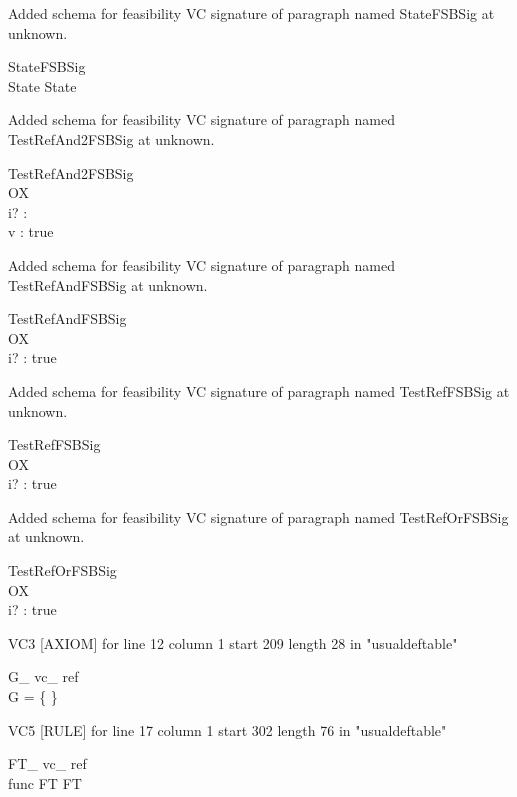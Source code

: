 \documentclass{article}
\begin{document}
Added schema for feasibility VC signature of paragraph named StateFSBSig at unknown.
\begin{schema}{StateFSBSig}
\\
 State 
\where
 State
\end{schema}


Added schema for feasibility VC signature of paragraph named TestRefAnd2FSBSig at unknown.
\begin{schema}{TestRefAnd2FSBSig}
\\
 OX \\
 i? : \nat \\
 v : \nat 
\where
 true
\end{schema}


Added schema for feasibility VC signature of paragraph named TestRefAndFSBSig at unknown.
\begin{schema}{TestRefAndFSBSig}
\\
 OX \\
 i? : \nat 
\where
 true
\end{schema}


Added schema for feasibility VC signature of paragraph named TestRefFSBSig at unknown.
\begin{schema}{TestRefFSBSig}
\\
 OX \\
 i? : \nat 
\where
 true
\end{schema}


Added schema for feasibility VC signature of paragraph named TestRefOrFSBSig at unknown.
\begin{schema}{TestRefOrFSBSig}
\\
 OX \\
 i? : \nat 
\where
 true
\end{schema}

VC3 [AXIOM] for line 12 column 1 start 209 length 28 in "usualdeftable"
\begin{theorem}{ G\_ vc\_ ref}\\
 \lnot G = \{ \} \\

\end{theorem}

VC5 [RULE] for line 17 column 1 start 302 length 76 in "usualdeftable"
\begin{theorem}{ FT\_ vc\_ ref}\\
 func \in \nat \cross FT \inj FT \\

\end{theorem}
\end{document}
